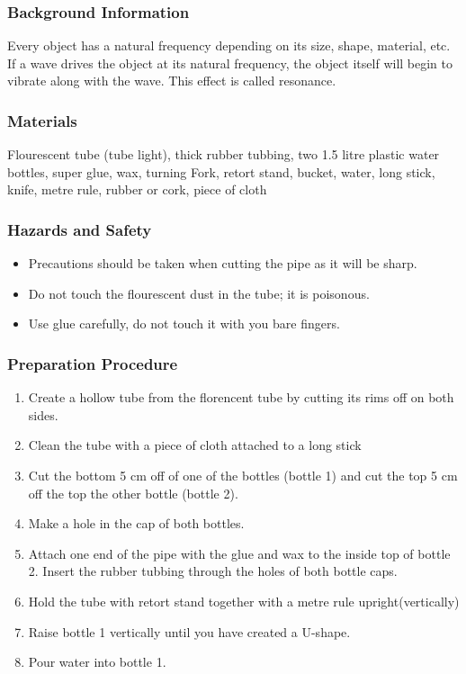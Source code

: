 \subsubsection*{Background Information}
Every object has a natural frequency depending on its size, shape, material, etc.  If a wave drives the object at its natural frequency, the object itself will begin to vibrate along with the wave.  This effect is called resonance.

\subsubsection*{Materials}
Flourescent tube (tube light), thick rubber tubbing, two 1.5 litre plastic water bottles, super glue, wax, turning Fork, retort stand, bucket, water, long stick, knife, metre rule, rubber or cork, piece of cloth

\subsubsection*{Hazards and Safety}
\begin{itemize}
\item{Precautions should be taken when cutting the pipe as it will be sharp.}
\item{Do not touch the flourescent dust in the tube; it is poisonous.} 
\item{Use glue carefully, do not touch it with you bare fingers.} 
\end{itemize}

\subsubsection*{Preparation Procedure}
\begin{enumerate}
\item{Create a hollow tube from the florencent tube by cutting its rims off on both sides.} 
\item{Clean the tube with a piece of cloth attached to a long stick}
\item{Cut the bottom 5 cm off of one of the bottles (bottle 1) and cut the top 5 cm off the top the other bottle (bottle 2).} 
\item{Make a hole in the cap of both bottles.} 
\item{Attach one end of the pipe with the glue and wax to the inside top of bottle 2. Insert the rubber tubbing through the holes of both bottle caps.} 
\item{Hold the tube with retort stand together with a metre rule upright(vertically)}
\item{Raise bottle 1 vertically until you have created a U-shape.} 
\item{Pour water into bottle 1.} 
\end{enumerate}

